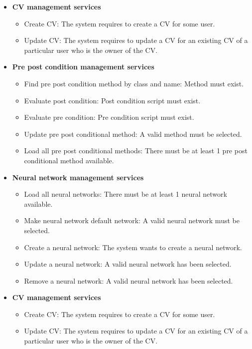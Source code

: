 \documentclass[12pt]{article}
\begin{document}
\begin{itemize}
	\item \textbf{CV management services}
		\begin{itemize}
			\item Create CV: The system requires to create a CV for some user.
			\item Update CV: The system requires to update a CV for an existing CV of a particular user who is the owner of the CV.					
		\end{itemize}
	\item \textbf{Pre post condition management services}
			\begin{itemize}
				\item Find pre post condition method by class and name: Method must exist.
				\item Evaluate post condition: Post condition script must exist.
				\item Evaluate pre condition: Pre condition script must exist.
				\item Update pre post conditional method: A valid method must be selected.	
				\item Load all pre post conditional methods: There must be at least 1 pre post conditional method available. 			
			\end{itemize}
	\item \textbf{Neural network management services}
			\begin{itemize}
				\item Load all neural networks: There must be at least 1 neural network available.
				\item Make neural network default network: A valid neural network must be selected.
				\item Create a neural network: The system wants to create a neural network.
				\item Update a neural network: A valid neural network has been selected.
				\item Remove a neural network: A valid neural network has been selected.			
			\end{itemize}
	\item \textbf{CV management services}
			\begin{itemize}
				\item Create CV: The system requires to create a CV for some user.
				\item Update CV: The system requires to update a CV for an existing CV of a particular user who is the owner of the CV.					
			\end{itemize}	
\end{itemize}	
\end{document}
